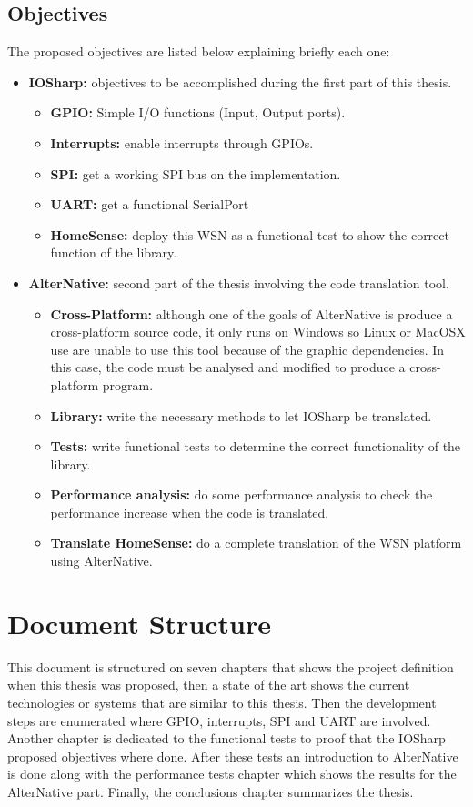 \subsection{Objectives}\label{SS:Proposal-Objectives}
The proposed objectives are listed below explaining briefly each one:  
\begin{itemize}
	\item \textbf{IOSharp:} objectives to be accomplished during the first part of this thesis.
		\begin{itemize}
		\item \textbf{GPIO:} Simple I/O functions (Input, Output ports).
		\item \textbf{Interrupts:} enable interrupts through GPIOs.
		\item \textbf{SPI:} get a working SPI bus on the implementation.
		\item \textbf{UART:} get a functional SerialPort
		\item \textbf{HomeSense:} deploy this WSN as a functional test to show the correct function of the library.
		\end{itemize}
	\item \textbf{AlterNative:} second part of the thesis involving the code translation tool.
		\begin{itemize}
		\item \textbf{Cross-Platform:} although one of the goals of AlterNative is produce a cross-platform source code, it only runs on Windows so Linux or MacOSX use are unable to use this tool because of the graphic dependencies. In this case, the code must be analysed and modified to produce a cross-platform program.
		\item \textbf{Library:} write the necessary methods to let IOSharp be translated.
		\item \textbf{Tests:} write functional tests to determine the correct functionality of the library.
		\item \textbf{Performance analysis:} do some performance analysis to check the performance increase when the code is translated.
		\item \textbf{Translate HomeSense:} do a complete translation of the WSN platform using AlterNative.
		\end{itemize}
\end{itemize}


\section{Document Structure}\label{SS:Proposal-Doc-Structure}
This document is structured on seven chapters that shows the project definition when this thesis was proposed, then a state of the art shows the current technologies or systems that are similar to this thesis. Then the development steps are enumerated where GPIO, interrupts, SPI and UART are involved. Another chapter is dedicated to the functional tests to proof that the IOSharp proposed objectives where done. After these tests an introduction to AlterNative is done along with the performance tests chapter which shows the results for the AlterNative part. Finally, the conclusions chapter summarizes the thesis.
